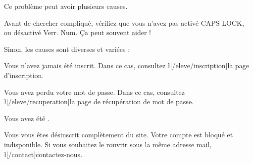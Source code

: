 Ce problème peut avoir plusieurs causes.

Avant de chercher compliqué, vérifiez que vous n'avez pas activé CAPS LOCK, ou désactivé Verr. Num. Ça peut souvent aider !

Sinon, les causes sont diverses et variées :
\item Vous n'avez jamais été inscrit. Dans ce cas, consultez \l[/eleve/inscription]{la page d'inscription}.
\item Vous avez perdu votre mot de passe. Dans ce cas, consultez \l[/eleve/recuperation]{la page de récupération de mot de passe}.
\item Vous avez été .
\item Vous vous êtes désinscrit complètement du site. Votre compte est bloqué et indisponible. Si vous souhaitez le rouvrir sous la même adresse mail, \l[/contact]{contactez-nous}.
